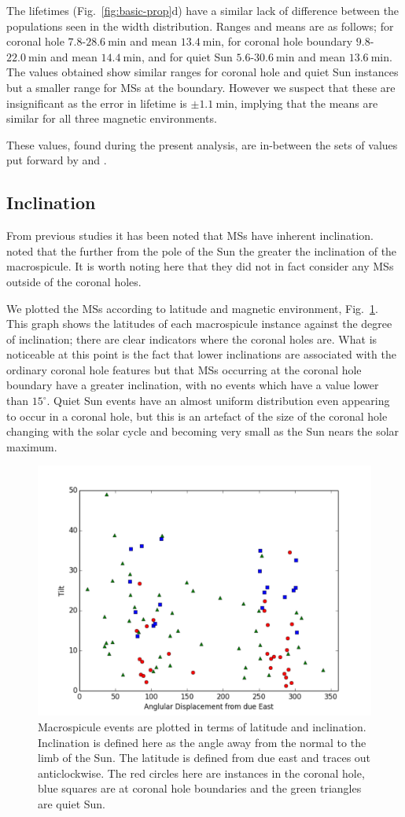 The lifetimes (Fig.~\ref{fig:basic-prop}d) have a similar lack of difference between the populations seen in the width distribution. Ranges and means are as follows; for coronal hole $7.8$-$28.6\ \textrm{min}$ and mean $13.4\ \textrm{min}$, for coronal hole boundary $9.8$-$22.0\ \textrm{min}$ and mean $14.4\ \textrm{min}$, and for quiet Sun $5.6$-$30.6\ \textrm{min}$ and mean $13.6\ \textrm{min}$. The values obtained show similar ranges for coronal hole and quiet Sun instances but a smaller range for MSs at the boundary. However we suspect that these are insignificant as the error in lifetime is $\pm1.1\ \textrm{min}$, implying that the means are similar for all three magnetic environments.

These values, found during the present analysis, are in-between the sets of values put forward by \cite{Bohlin1975} and \cite{Dere89}.

\subsection{Inclination} 
From previous studies it has been noted that MSs have inherent inclination. \cite{Bohlin1975} noted that the further from the pole of the Sun the greater the inclination of the macrospicule. It is worth noting here that they did not in fact consider any MSs outside of the coronal holes. 

We plotted the MSs according to latitude and magnetic environment, Fig.~\ref{fig:tilt-lat}. This graph shows the latitudes of each macrospicule instance against the degree of inclination; there are clear indicators where the coronal holes are. What is noticeable at this point is the fact that lower inclinations are associated with the ordinary coronal hole features but that MSs occurring at the coronal hole boundary have a greater inclination, with no events which have a value lower than $15^{\circ}$. Quiet Sun events have an almost uniform distribution even appearing to occur in a coronal hole, but this is an artefact of the size of the coronal hole changing with the solar cycle and becoming very small as the Sun nears the solar maximum. 


\begin{figure}[t!]
	\centering
	\includegraphics[width=0.5\columnwidth]{Chapter3/Figs/tilt_vs_lat.pdf}	
	\caption{\small Macrospicule events are plotted in terms of latitude and inclination. Inclination is defined here as the angle away from the normal to the limb of the Sun. The latitude is defined from due east and traces out anticlockwise. The red circles here are instances in the coronal hole, blue squares are at coronal hole boundaries and the green triangles are quiet Sun.}
	\label{fig:tilt-lat}
\end{figure}


